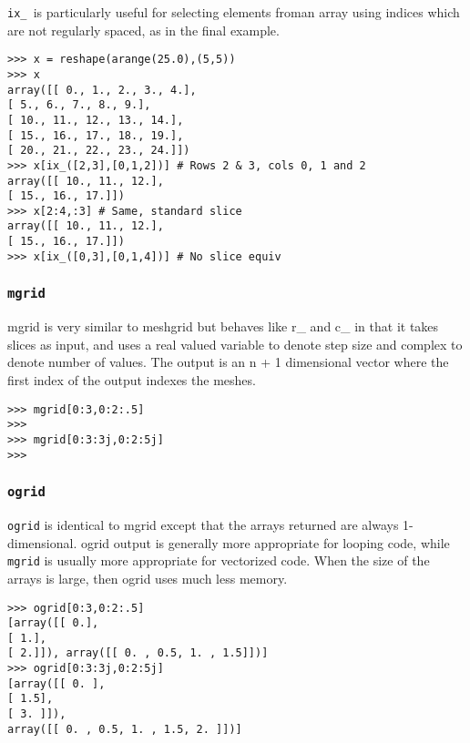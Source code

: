 \documentclass[KSmain.tex]{subfiles}
\begin{document}
\noindent \texttt{ix\_ }is particularly useful for selecting elements froman array using indices which are not regularly
spaced, as in the final example.
\begin{framed}
\begin{verbatim}
>>> x = reshape(arange(25.0),(5,5))
>>> x
array([[ 0., 1., 2., 3., 4.],
[ 5., 6., 7., 8., 9.],
[ 10., 11., 12., 13., 14.],
[ 15., 16., 17., 18., 19.],
[ 20., 21., 22., 23., 24.]])
>>> x[ix_([2,3],[0,1,2])] # Rows 2 & 3, cols 0, 1 and 2
array([[ 10., 11., 12.],
[ 15., 16., 17.]])
>>> x[2:4,:3] # Same, standard slice
array([[ 10., 11., 12.],
[ 15., 16., 17.]])
>>> x[ix_([0,3],[0,1,4])] # No slice equiv
\end{verbatim}
\end{framed}
\subsubsection{\texttt{mgrid}}
mgrid is very similar to meshgrid but behaves like r\_ and c\_ in that it takes slices as input, and uses a
real valued variable to denote step size and complex to denote number of values. The output is an n + 1
dimensional vector where the first index of the output indexes the meshes.
\begin{framed}
\begin{verbatim}
>>> mgrid[0:3,0:2:.5]
>>>
>>> mgrid[0:3:3j,0:2:5j]
>>>
\end{verbatim}
\end{framed}

\subsubsection{\texttt{ogrid}}
\texttt{ogrid} is identical to mgrid except that the arrays returned are always 1-dimensional. ogrid output is generally
more appropriate for looping code, while \texttt{mgrid} is usually more appropriate for vectorized code.
When the size of the arrays is large, then ogrid uses much less memory.
\begin{framed}
\begin{verbatim}
>>> ogrid[0:3,0:2:.5]
[array([[ 0.],
[ 1.],
[ 2.]]), array([[ 0. , 0.5, 1. , 1.5]])]
>>> ogrid[0:3:3j,0:2:5j]
[array([[ 0. ],
[ 1.5],
[ 3. ]]),
array([[ 0. , 0.5, 1. , 1.5, 2. ]])]
\end{verbatim}
\end{framed}
\end{document}
